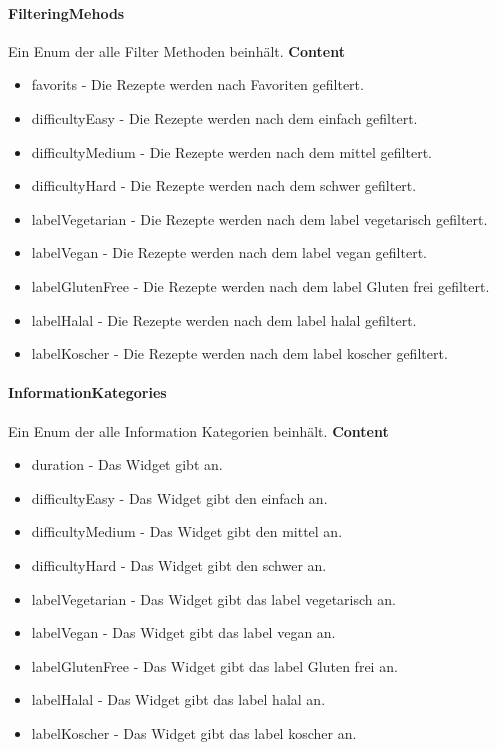 \documentclass[parskip=full]{scrartcl}
\begin{document}
\paragraph{FilteringMehods}
Ein Enum der alle Filter Methoden beinhält.
\textbf{Content}
\begin{itemize}
    \item favorits - Die Rezepte werden nach Favoriten gefiltert.
    \item difficultyEasy - Die Rezepte werden nach dem  einfach gefiltert.
    \item difficultyMedium - Die Rezepte werden nach dem  mittel gefiltert.
    \item difficultyHard - Die Rezepte werden nach dem  schwer gefiltert.
    \item labelVegetarian - Die Rezepte werden nach dem \gls{label} vegetarisch gefiltert.
    \item labelVegan - Die Rezepte werden nach dem \gls{label} vegan gefiltert.
    \item labelGlutenFree - Die Rezepte werden nach dem \gls{label} Gluten frei gefiltert.
    \item labelHalal - Die Rezepte werden nach dem \gls{label} halal gefiltert.
    \item labelKoscher - Die Rezepte werden nach dem \gls{label} koscher gefiltert.
\end{itemize}

\paragraph{InformationKategories}
Ein Enum der alle Information Kategorien beinhält.
\textbf{Content}
\begin{itemize}
    \item duration - Das Widget gibt an.
    \item difficultyEasy - Das Widget gibt den  einfach an.
    \item difficultyMedium - Das Widget gibt den  mittel an.
    \item difficultyHard - Das Widget gibt den  schwer an.
    \item labelVegetarian - Das Widget gibt das \gls{label} vegetarisch an.
    \item labelVegan - Das Widget gibt das \gls{label} vegan an.
    \item labelGlutenFree - Das Widget gibt das \gls{label} Gluten frei an.
    \item labelHalal - Das Widget gibt das \gls{label} halal an.
    \item labelKoscher - Das Widget gibt das \gls{label} koscher an.
\end{itemize}
\end{document}
